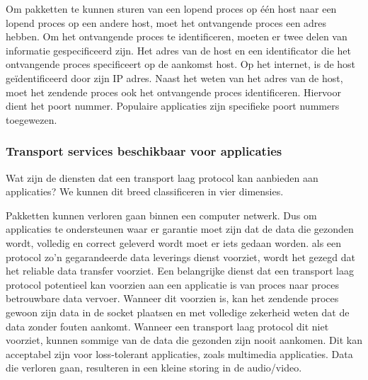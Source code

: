\clearpage


Om pakketten te kunnen sturen van een lopend proces op één host naar een lopend proces op een andere host, moet het ontvangende proces een adres hebben. Om het ontvangende proces te identificeren, moeten er twee delen van informatie gespecificeerd zijn. Het adres van de host en een identificator die het ontvangende proces specificeert op de aankomst host.
Op het internet, is de host geïdentificeerd door zijn IP adres. Naast het weten van het adres van de host, moet het zendende proces ook het ontvangende proces identificeren. Hiervoor dient het poort nummer. Populaire applicaties zijn specifieke poort nummers toegewezen.

\subsubsection{Transport services beschikbaar voor applicaties}

Wat zijn de diensten dat een transport laag protocol kan aanbieden aan applicaties? We kunnen dit breed classificeren in vier dimensies.


Pakketten kunnen verloren gaan binnen een computer netwerk. Dus om applicaties te ondersteunen waar er garantie moet zijn dat de data die gezonden wordt, volledig en correct geleverd wordt moet er iets gedaan worden. als een protocol zo’n gegarandeerde data leverings dienst voorziet, wordt het gezegd dat het reliable data transfer voorziet. Een belangrijke dienst dat een transport laag protocol potentieel kan voorzien aan een applicatie is van proces naar proces betrouwbare data vervoer. Wanneer dit voorzien is, kan het zendende proces gewoon zijn data in de socket plaatsen en met volledige zekerheid weten dat de data zonder fouten aankomt.
Wanneer een transport laag protocol dit niet voorziet, kunnen sommige van de data die gezonden zijn nooit aankomen. Dit kan acceptabel zijn voor loss-tolerant applicaties, zoals multimedia applicaties. Data die verloren gaan, resulteren in een kleine storing in de audio/video.

\clearpage



